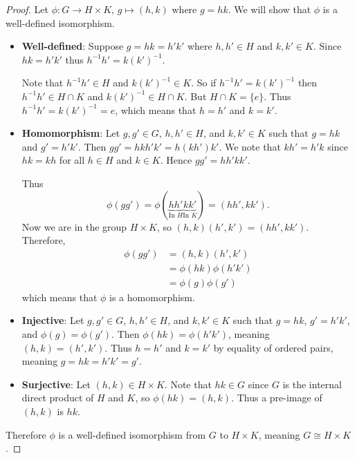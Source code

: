\begin{proof}
    Let $\phi: G \to H \times K$, $g \mapsto (h, k)$ where $g = hk$. We will show that $\phi$ is a well-defined isomorphism.
    \begin{itemize}
        \item \textbf{Well-defined}: Suppose $g = hk = h'k'$ where $h, h' \in H$ and $k, k' \in K$. Since $hk = h'k'$ thus $h^{-1}h' = k(k')^{-1}$.

        Note that $h^{-1}h' \in H$ and $k(k')^{-1} \in K$. So if $h^{-1}h' = k(k')^{-1}$ then $h^{-1}h' \in H \cap K$ and $k(k')^{-1} \in H \cap K$. But $H \cap K = \{e\}$. Thus $h^{-1}h' = k(k')^{-1} = e$, which means that $h = h'$ and $k = k'$.
        
        \item \textbf{Homomorphism}: Let $g, g' \in G$, $h, h' \in H$, and $k, k' \in K$ such that $g = hk$ and $g' = h'k'$. Then $gg' = hkh'k' = h(kh')k'$. We note that $kh' = h'k$ since $hk = kh$ for all $h \in H$ and $k \in K$. Hence $gg' = hh'kk'$.
        
        Thus
        \[
            \phi(gg') = \phi(\underbrace{hh'}_{\text{In }H}\underbrace{kk'}_{\text{In }K}) = (hh', kk').
        \]
        Now we are in the group $H \times K$, so $(h, k)(h', k') = (hh', kk')$. Therefore,
        \begin{align*}
            \phi(gg') &= (h,k)(h',k')\\
            &= \phi(hk)\phi(h'k')\\
            &= \phi(g)\phi(g')
        \end{align*}
        which means that $\phi$ is a homomorphism.
        
        \item \textbf{Injective}: Let $g, g' \in G$, $h, h' \in H$, and $k, k' \in K$ such that $g = hk$, $g' = h'k'$, and $\phi(g) = \phi(g')$. Then $\phi(hk) = \phi(h'k')$, meaning $(h,k) = (h',k')$. Thus $h = h'$ and $k = k'$ by equality of ordered pairs, meaning $g = hk = h'k' = g'$.
        
        \item \textbf{Surjective}: Let $(h, k) \in H \times K$. Note that $hk \in G$ since $G$ is the internal direct product of $H$ and $K$, so $\phi(hk) = (h, k)$. Thus a pre-image of $(h, k)$ is $hk$.
    \end{itemize}
    Therefore $\phi$ is a well-defined isomorphism from $G$ to $H \times K$, meaning $G \cong H \times K$.
\end{proof}

